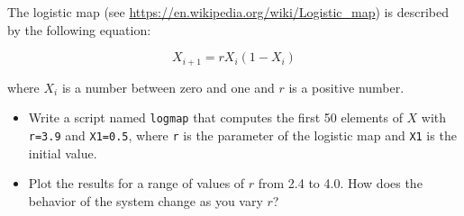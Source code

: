 \begin{ex}
The logistic map (see \url{https://en.wikipedia.org/wiki/Logistic_map}) is described by the following equation:


\begin{equation}
X_{i+1} = r X_i (1-X_i)
\end{equation}

where $X_i$ is a number between zero and one and $r$ is a positive number.

\begin{itemize}

\item Write a script named {\tt logmap} that computes the first 50
elements of $X$ with {\tt r=3.9} and {\tt X1=0.5}, where
{\tt r} is the parameter of the logistic map and {\tt X1} is the
initial value.

\item Plot the results for a range of values of $r$ from 2.4 to 4.0.
How does the behavior of the system change as you vary $r$?

\end{itemize}

\end{ex}


